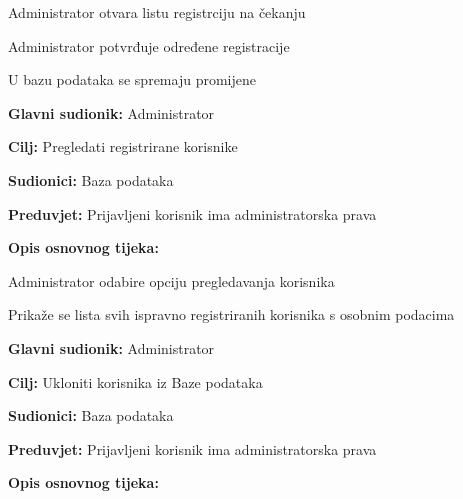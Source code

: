 \begin{packed_item}
\begin{packed_item}
\begin{packed_item}
						\item[] \begin{packed_enum}
	
							\item Administrator otvara listu registrciju na čekanju
							\item Administrator potvrđuje određene registracije
							\item U bazu podataka se spremaju promijene
							
						\end{packed_enum}

        	
					\end{packed_item}

                        \noindent {}
					\begin{packed_item}
	
						\item \textbf{Glavni sudionik: }Administrator
						\item  \textbf{Cilj:} Pregledati registrirane korisnike
						\item  \textbf{Sudionici:} Baza podataka
						\item  \textbf{Preduvjet:} Prijavljeni korisnik ima administratorska prava
						\item  \textbf{Opis osnovnog tijeka:}
						
						\item[] \begin{packed_enum}
	
							\item Administrator odabire opciju pregledavanja korisnika
							\item Prikaže se lista svih ispravno registriranih korisnika s osobnim podacima
			
						\end{packed_enum}

                    
					\end{packed_item}

                        \noindent {}
					\begin{packed_item}
	
						\item \textbf{Glavni sudionik: }Administrator
						\item  \textbf{Cilj:} Ukloniti korisnika iz Baze podataka
						\item  \textbf{Sudionici:} Baza podataka
						\item  \textbf{Preduvjet:} Prijavljeni korisnik ima administratorska prava
						\item  \textbf{Opis osnovnog tijeka:}
						

\end{packed_item}
\end{packed_item}
\end{packed_item}
